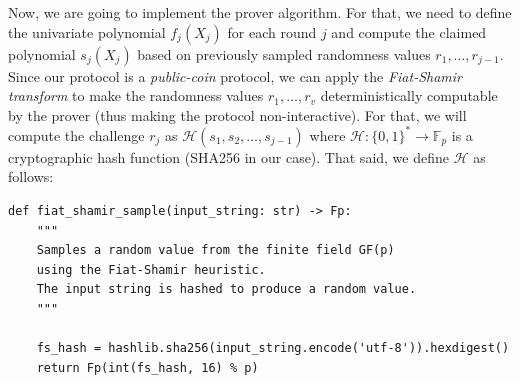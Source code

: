 \documentclass[../../book.tex]{subfiles}
\begin{document}
Now, we are going to implement the prover algorithm. For that, we need to define
the univariate polynomial $f_j(X_j)$ for each round $j$ and compute the claimed
polynomial $s_j(X_j)$ based on previously sampled randomness values
$r_1,\dots,r_{j-1}$. Since our protocol is a \textit{public-coin} protocol, we
can apply the \textit{Fiat-Shamir transform} to make the randomness values
$r_1,\dots,r_v$ deterministically computable by the prover (thus making the
protocol non-interactive). For that, we will compute the challenge $r_j$ as
$\mathcal{H}(s_1, s_2, \dots, s_{j-1})$ where $\mathcal{H}: \{0,1\}^* \to
\mathbb{F}_p$ is a cryptographic hash function (SHA256 in our case). That 
said, we define $\mathcal{H}$ as follows:
\begin{verbatim}
def fiat_shamir_sample(input_string: str) -> Fp:
    """
    Samples a random value from the finite field GF(p) 
    using the Fiat-Shamir heuristic.
    The input string is hashed to produce a random value.
    """

    fs_hash = hashlib.sha256(input_string.encode('utf-8')).hexdigest()
    return Fp(int(fs_hash, 16) % p)
\end{verbatim}
\end{document}
